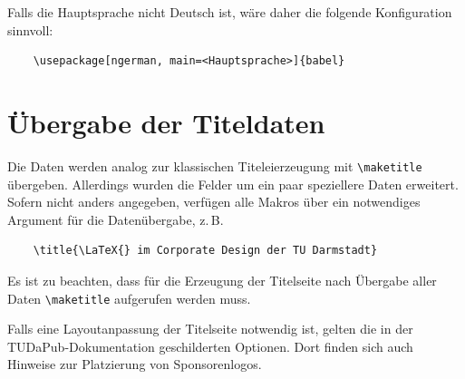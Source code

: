 \documentclass[
	ngerman,
	ruledheaders=chapter,%
	class=book,%
	thesis={
		type=dr,
		dr=rernat
	},
	accentcolor=9c,%
	custommargins=true,%
	marginpar=false,%
	fontsize=11pt,%
]{tudapub}
\begin{document}
Falls die Hauptsprache nicht Deutsch ist, wäre daher die folgende Konfiguration sinnvoll:
\begin{verbatim}
	\usepackage[ngerman, main=<Hauptsprache>]{babel}
\end{verbatim}

\section{Übergabe der Titeldaten}

Die Daten werden analog zur klassischen Titeleierzeugung mit \verb+\maketitle+ übergeben. Allerdings wurden die Felder um ein paar speziellere Daten erweitert. Sofern nicht anders angegeben, verfügen alle Makros über ein notwendiges Argument für die Datenübergabe, z.\,B.
\begin{verbatim}
	\title{\LaTeX{} im Corporate Design der TU Darmstadt}
\end{verbatim}
Es ist zu beachten, dass für die Erzeugung der Titelseite nach Übergabe aller Daten \verb+\maketitle+ aufgerufen werden muss.

Falls eine Layoutanpassung der Titelseite notwendig ist, gelten die in der TUDaPub-Dokumentation geschilderten Optionen. Dort finden sich auch Hinweise zur Platzierung von Sponsorenlogos. \cite{tudapub}
\end{document}
